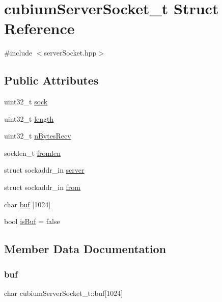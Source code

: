 \hypertarget{structcubiumServerSocket__t}{}\section{cubium\+Server\+Socket\+\_\+t Struct Reference}
\label{structcubiumServerSocket__t}


{\ttfamily \#include $<$server\+Socket.\+hpp$>$}

\subsection*{Public Attributes}
\begin{DoxyCompactItemize}
\item 
uint32\+\_\+t \hyperlink{structcubiumServerSocket__t_a5159f109598a928b1aaabe1abe61bcb3}{sock}
\item 
uint32\+\_\+t \hyperlink{structcubiumServerSocket__t_abab42f1ee816ec8020514ae922014783}{length}
\item 
uint32\+\_\+t \hyperlink{structcubiumServerSocket__t_a5248230a046c0e0be78fea2ca1abaef5}{n\+Bytes\+Recv}
\item 
socklen\+\_\+t \hyperlink{structcubiumServerSocket__t_a92189e1e1fdc939b85f2ec61a434ab9c}{fromlen}
\item 
struct sockaddr\+\_\+in \hyperlink{structcubiumServerSocket__t_a24502fdef7b46f9c843ba9c7c0727082}{server}
\item 
struct sockaddr\+\_\+in \hyperlink{structcubiumServerSocket__t_a190b687c6f4e9a792e237975ac613f5f}{from}
\item 
char \hyperlink{structcubiumServerSocket__t_a32dcf50a28a788d8b114c05d80b3a2d9}{buf} \mbox{[}1024\mbox{]}
\item 
bool \hyperlink{structcubiumServerSocket__t_a8f18b67d771fb4cbd1ec23e82acc120f}{is\+Buf} = false
\end{DoxyCompactItemize}


\subsection{Member Data Documentation}
\mbox{\label{structcubiumServerSocket__t_a32dcf50a28a788d8b114c05d80b3a2d9}} 
\subsubsection{\texorpdfstring{buf}{buf}}
{\footnotesize\ttfamily char cubium\+Server\+Socket\+\_\+t\+::buf\mbox{[}1024\mbox{]}}

